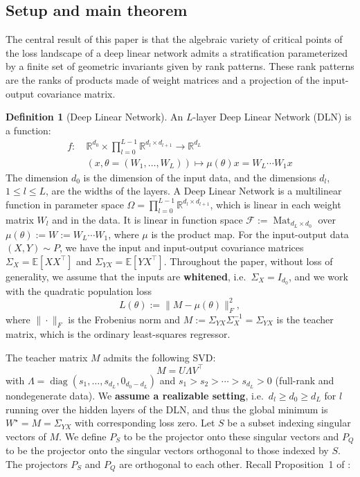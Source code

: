 \documentclass[11pt]{article}
\theoremstyle{definition}
\newtheorem{definition}[theorem]{Definition}
\begin{document}
\subsection{Setup and main theorem}
The central result of this paper is that the algebraic variety of critical points of the loss landscape of a deep linear network admits a stratification parameterized by a finite set of geometric invariants given by rank patterns. These rank patterns are the ranks of products made of weight matrices and a projection of the input-output covariance matrix.
\begin{definition}[Deep Linear Network]
An \(L\)-layer Deep Linear Network (DLN) is a function:
\begin{align*}
    f: \ & \mathbb{R}^{d_0} \times \prod_{l=0}^{L-1}\mathbb{R}^{d_l \times d_{l+1}}  \to \mathbb{R}^{d_L} \\
       & (x,\theta = (W_1,\ldots,W_L)) \mapsto \mu(\theta)x = W_L\cdots W_1 x
\end{align*}
The dimension \(d_0\) is the dimension of the input data, and the dimensions \(d_l\), \(1\leq l \leq L\), are the widths of the layers. A Deep Linear Network is a multilinear function in parameter space \(\Omega=\prod_{l=0}^{L-1}\mathbb{R}^{d_l \times d_{l+1}}\), which is linear in each weight matrix \(W_l\) and in the data. It is linear in function space \(\mathcal{F}:=\operatorname{Mat}_{d_L\times d_0}\) over \(\mu(\theta):=W:=W_L\cdots W_1\), where \(\mu\) is the product map. For the input-output data \((X,Y)\sim P\), we have the input and input-output covariance matrices \(\Sigma_X = \mathbb{E}[XX^{\top}]\) and \(\Sigma_{YX}=\mathbb{E}[YX^{\top}]\). Throughout the paper, without loss of generality, we assume that the inputs are \textbf{whitened}, i.e.\ \(\Sigma_X = I_{d_0}\), and we work with the quadratic population loss
\[
L(\theta) := \|M - \mu(\theta)\|^2_F,
\]
where \(\|\cdot\|_F\) is the Frobenius norm and \(M:=\Sigma_{YX}\Sigma_X^{-1} = \Sigma_{YX}\) is the teacher matrix, which is the ordinary least-squares regressor.
\end{definition}
The teacher matrix \(M\) admits the following SVD:
\[
M = U\Lambda V^{\top}
\]
with \(\Lambda = \operatorname{diag}(s_1,\ldots,s_{d_L}, 0_{d_0-d_L})\) and \(s_1 > s_2 > \cdots > s_{d_L} > 0\) (full-rank and nondegenerate data). We \textbf{assume a realizable setting}, i.e.\ \(d_l \geq d_0 \geq d_L\) for \(l\) running over the hidden layers of the DLN, and thus the global minimum is \(W^{\star}=M=\Sigma_{YX}\) with corresponding loss zero. Let \(S\) be a subset indexing singular vectors of \(M\). We define \(P_S\) to be the projector onto these singular vectors and \(P_Q\) to be the projector onto the singular vectors orthogonal to those indexed by \(S\). The projectors \(P_S\) and \(P_Q\) are orthogonal to each other. Recall Proposition~1 of \cite{achour2024loss}:
\end{document}

